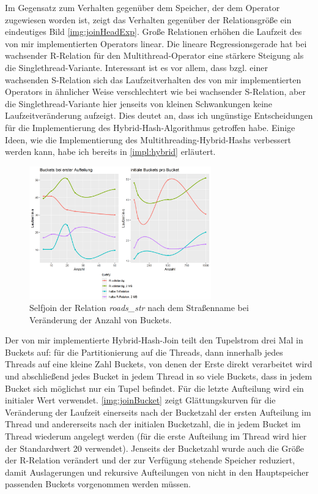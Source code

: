 \documentclass[a4paper,12pt,twoside]{article}
\newcommand{\Fb}[1]{\textit{#1}} %
\begin{document}
Im Gegensatz zum Verhalten gegenüber dem Speicher, der dem Operator zugewiesen worden ist, zeigt das Verhalten gegenüber der Relationsgröße ein eindeutiges Bild \autoref{img:joinHeadExp}. Große Relationen erhöhen die Laufzeit des von mir implementierten Operators linear. Die lineare Regressionsgerade hat bei wachsender R-Relation für den Multithread-Operator eine stärkere Steigung als die Singlethread-Variante. Interessant ist es vor allem, dass bzgl. einer wachsenden S-Relation sich das Laufzeitverhalten des von mir implementierten Operators in ähnlicher Weise verschlechtert wie bei wachsender S-Relation, aber die Singlethread-Variante hier jenseits von kleinen Schwankungen keine Laufzeitveränderung aufzeigt. Dies deutet an, dass ich ungünstige Entscheidungen für die Implementierung des Hybrid-Hash-Algorithmus getroffen habe. Einige Ideen, wie die Implementierung des Multithreading-Hybrid-Hashs verbessert werden kann, habe ich bereits in \autoref{impl:hybrid} erläutert.   

\begin{figure}
	\centering
	\includegraphics[width=0.70\textwidth]{Bilder/join_bucket.png}
	\caption{Selfjoin der Relation \Fb{roads\_str} nach dem Straßenname bei Veränderung der Anzahl von Buckets.}
	\label{img:joinBucket}
\end{figure}

Der von mir implementierte Hybrid-Hash-Join teilt den Tupelstrom drei Mal in Buckets auf: für die Partitionierung auf die Threads, dann innerhalb jedes Threads auf eine kleine Zahl Buckets, von denen der Erste direkt verarbeitet wird und abschließend jedes Bucket in jedem Thread in so viele Buckets, dass in jedem Bucket sich möglichst nur ein Tupel befindet. Für die letzte Aufteilung wird ein initialer Wert verwendet. \autoref{img:joinBucket} zeigt Glättungskurven für die Veränderung der Laufzeit einerseits nach der Bucketzahl der ersten Aufteilung im Thread und andererseits nach der initialen Bucketzahl, die in jedem Bucket im Thread wiederum angelegt werden (für die erste Aufteilung im Thread wird hier der Standardwert 20 verwendet). Jenseits der Bucketzahl wurde auch die Größe der R-Relation verändert und der zur Verfügung stehende Speicher reduziert, damit Auslagerungen und rekursive Aufteilungen von nicht in den Hauptspeicher passenden Buckets vorgenommen werden müssen.
\end{document}

